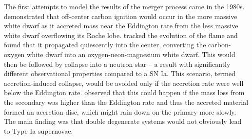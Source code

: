 \documentclass[iop]{../emulateapj}
\begin{document}
The first attempts to model the results of the merger process came in the
1980s. \cite{nomotoiben:1985} demonstrated that off-center carbon
ignition would occur in the more massive white dwarf as it accreted
mass near the Eddington rate from the less massive white dwarf
overflowing its Roche lobe. \cite{saionomoto:1985} tracked the
evolution of the flame and found that it propagated quiescently into
the center, converting the carbon-oxygen white dwarf into an
oxygen-neon-magnesium white dwarf. This would then be followed by
collapse into a neutron star -- a result with significantly different
observational properties compared to a SN Ia. This scenario, termed
accretion-induced collapse, would be avoided only if the accretion
rate were well below the Eddington rate. \cite{tutukov_yungelson:1979}
observed that this could happen if the mass loss from the secondary
was higher than the Eddington rate and thus the accreted material
formed an accretion disc, which might rain down on the primary more
slowly. The main finding was that double degenerate systems would not
obviously lead to Type Ia supernovae.
\end{document}
